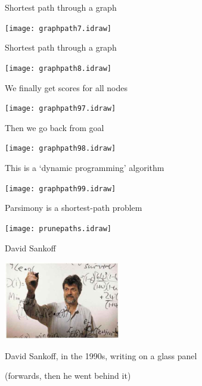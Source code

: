 \documentclass[bluish,slideColor,colorBG,pdf]{prosper}
\begin{document}
\begin{slide}[Replace]{Shortest path through a graph}

\centerline{\texttt{[image: graphpath7.idraw]}}

\end{slide}

\begin{slide}[Replace]{Shortest path through a graph}

\centerline{\texttt{[image: graphpath8.idraw]}}

\end{slide}

\begin{slide}[Replace]{We finally get scores for all nodes}

\centerline{\texttt{[image: graphpath97.idraw]}}

\end{slide}

\begin{slide}[Replace]{Then we go back from goal}

\centerline{\texttt{[image: graphpath98.idraw]}}

\end{slide}

\begin{slide}[Replace]{This is a `dynamic programming' algorithm}

\centerline{\texttt{[image: graphpath99.idraw]}}

\end{slide}

\begin{slide}[Replace]{Parsimony is a shortest-path problem}

\centerline{\texttt{[image: prunepaths.idraw]}}

\end{slide}

\begin{slide}[Replace]{David Sankoff}

\centerline{\includegraphics[width=2in]{sankoff4.ps}}
\bigskip

\centerline{David Sankoff, in the 1990s, writing on a glass panel}
\centerline{(forwards, then he went behind it)}

\end{slide}
\end{document}
